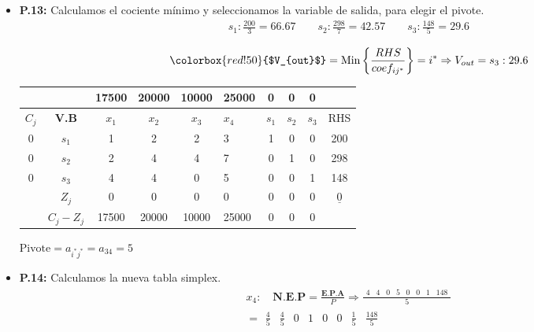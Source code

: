 \documentclass{templateNote}
\begin{document}
\begin{itemize}
    \item \textbf{P.13:} Calculamos el cociente mínimo y seleccionamos la variable de salida, para elegir el pivote.
    \begin{align*}
        s_1: \frac{200}{3} = 66.67 \qquad s_2: \frac{298}{7} = 42.57 \qquad s_3: \frac{148}{5} = 29.6 \\
    \end{align*}
    \begin{equation*}
        \colorbox{red!50}{$V_{out}$} = \text{Min} \left\{ \frac{RHS}{coef_{ij^*}} \right\} = i^* \Rightarrow V_{out} = s_3 : 29.6
    \end{equation*}
    \begin{center}
        \begin{tabular}{|c|c|c|c|c|g|c|c|c|c|}
            \hline
            & & 17500 & 20000 & 10000 & 25000 & 0 & 0 & 0 & \\ \hline
            $C_j$ & \textbf{V.B} & $x_1$ & $x_2$ & $x_3$ & $x_4$ & $s_1$ & $s_2$ & $s_3$ & RHS \\  & $s_1$ & 1 & 2 & 2 & 3 & 1 & 0 & 0 & 200 \\
            0 & $s_2$ & 2 & 4 & 4 & 7 & 0 & 1 & 0 & 298 \\
            0 & $s_3$ & 4 & 4 & 0 & 5 & 0 & 0 & 1 & 148 \\ \hline
            & $Z_j$ & 0 & 0 & 0 & 0 & 0 & 0 & 0 & $\underline{0}$ \\ \hline
            & $C_j - Z_j$ & 17500 & 20000 & 10000 & 25000 & 0 & 0 & 0 & \\ \hline
        \end{tabular}
    \end{center}
    \begin{center}
        $\text{Pivote} = a_{i^*j^*} = a_{34} = 5$
    \end{center}

    \item \textbf{P.14:} Calculamos la nueva tabla simplex.
    \begin{align*}
        x_4: \quad \textbf{N.E.P} = \frac{\textbf{E.P.A}}{P} \Rightarrow \frac{\begin{array}{cccccccc} 4 & 4 & 0 & 5 & 0 & 0 & 1 & 148\end{array}}{5} \\
        = \begin{array}{cccccccc} \frac{4}{5} & \frac{4}{5} & 0 & 1 & 0 & 0 & \frac{1}{5} & \frac{148}{5}\end{array}
    \end{align*}


\end{itemize}
\end{document}
